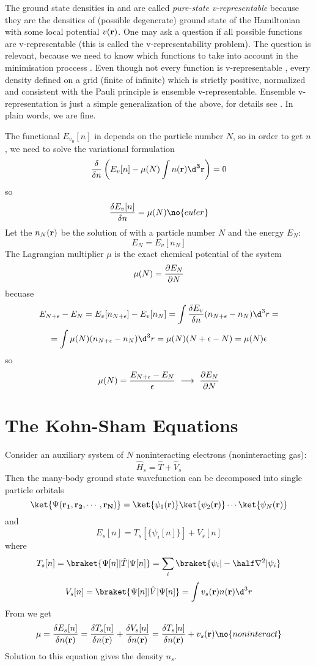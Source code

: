 The ground state densities in  and  are called {\it
pure-state v-representable\/} because they are the densities of (possible
degenerate) ground state of the Hamiltonian with some local potential 
$v({\bf r})$. One may ask a question if all possible functions are
v-representable (this is called the v-representability problem). The question
is relevant, because we need to know which functions to take into account in
the minimisation proccess . Even though not every function is
v-representable \cite{DFT}, every density defined on a grid (finite of
infinite) which is strictly positive, normalized and consistent with the Pauli
principle is ensemble v-representable. Ensemble v-representation is just a
simple generalization of the above, for details see \cite{DFT}. In plain words,
we are fine.

The functional $E_{v_0}[n]$ in  depends on the particle number $N$,
so in order to get $n$, we need to solve the variational formulation
$${\delta\over\delta n}\left(E_v[n]-\mu(N)\int n(\bf r)\d^3r\right)=0$$
so
$${\delta E_v[n]\over\delta n}=\mu(N)\no{euler}$$
Let the $n_N(\bf r)$ be the solution of  with a particle number $N$
and the energy $E_N$:
$$E_N=E_v[n_N]$$
The Lagrangian multiplier $\mu$ is the exact chemical potential of the system
$$\mu(N)={\partial E_N\over\partial N}$$
becuase
$$E_{N+\epsilon}-E_N=E_v[n_{N+\epsilon}]-E_v[n_N]
=\int {\delta E_v\over\delta n} (n_{N+\epsilon}-n_N)\d^3r=
$$
$$=\int \mu(N) (n_{N+\epsilon}-n_N)\d^3r
=\mu(N)(N+\epsilon-N)=\mu(N)\epsilon$$
so
$$\mu(N)={E_{N+\epsilon}-E_N\over\epsilon}
\ \longrightarrow \
{\partial E_N\over\partial N}$$

\section{The Kohn-Sham Equations}

Consider an auxiliary system of $N$ noninteracting electrons (noninteracting
gas):
$$\hat H_s=\hat T+\hat V_s$$
Then the many-body ground state wavefunction can be decomposed into single particle orbitals
$$\ket{\Psi ({\bf r_1},{\bf r_2},\cdots,{\bf r_N})}=
\ket{\psi_1({\bf r})}\ket{\psi_2({\bf r})}\cdots\ket{\psi_N({\bf r})}$$
and
$$E_s[n]=T_s[\{\psi_i[n]\}]+V_s[n]$$
where
$$T_s[n]=\braket{\Psi[n]|\hat T|\Psi[n]}=
\sum_i\braket{\psi_i|-\half\nabla^2|\psi_i}$$
$$V_s[n]=\braket{\Psi[n]|\hat V|\Psi[n]}=\int v_s({\bf r})n({\bf r})\d^3r$$
From \rno{euler} we get
$$\mu={\delta E_s[n]\over\delta n({\bf r})}=
{\delta T_s[n]\over\delta n({\bf r})}+{\delta V_s[n]\over\delta n({\bf r})}=
{\delta T_s[n]\over\delta n({\bf r})}+v_s({\bf r})\no{noninteract}
$$
Solution to this equation gives the density $n_s$.

